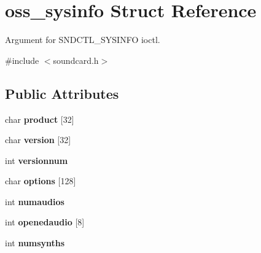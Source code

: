 \hypertarget{structoss__sysinfo}{}\section{oss\+\_\+sysinfo Struct Reference}
\label{structoss__sysinfo}


Argument for S\+N\+D\+C\+T\+L\+\_\+\+S\+Y\+S\+I\+N\+FO ioctl.  




{\ttfamily \#include $<$soundcard.\+h$>$}

\subsection*{Public Attributes}
\begin{DoxyCompactItemize}
\item 
char {\bfseries product} \mbox{[}32\mbox{]}\hypertarget{structoss__sysinfo_a476c498fccc185f4d1353e5ef96c41e1}{}\label{structoss__sysinfo_a476c498fccc185f4d1353e5ef96c41e1}

\item 
char {\bfseries version} \mbox{[}32\mbox{]}\hypertarget{structoss__sysinfo_aec163611d69f5a081b91adef58986282}{}\label{structoss__sysinfo_aec163611d69f5a081b91adef58986282}

\item 
int {\bfseries versionnum}\hypertarget{structoss__sysinfo_a552d5961c58d477b0a576e33b5890c25}{}\label{structoss__sysinfo_a552d5961c58d477b0a576e33b5890c25}

\item 
char {\bfseries options} \mbox{[}128\mbox{]}\hypertarget{structoss__sysinfo_adc65928a29fee161f6ad290f3ff27ef9}{}\label{structoss__sysinfo_adc65928a29fee161f6ad290f3ff27ef9}

\item 
int {\bfseries numaudios}\hypertarget{structoss__sysinfo_a85df0f157c505716c67b8f5b051753b7}{}\label{structoss__sysinfo_a85df0f157c505716c67b8f5b051753b7}

\item 
int {\bfseries openedaudio} \mbox{[}8\mbox{]}\hypertarget{structoss__sysinfo_a260210fd0df51be4f0bc197dc2b13c2c}{}\label{structoss__sysinfo_a260210fd0df51be4f0bc197dc2b13c2c}

\item 
int {\bfseries numsynths}\hypertarget{structoss__sysinfo_a20fa3506a6b0a03cd345c8d2c82ae68e}{}\label{structoss__sysinfo_a20fa3506a6b0a03cd345c8d2c82ae68e}


\end{DoxyCompactItemize}

